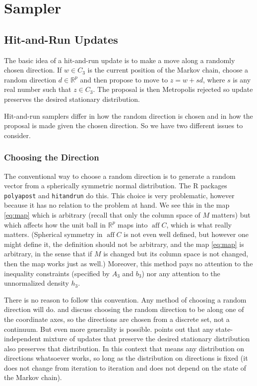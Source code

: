 \documentclass[11pt]{article}
\DeclareMathOperator{\aff}{aff}
\newcommand{\real}{\mathbb{R}}
\begin{document}
\section{Sampler}

\subsection{Hit-and-Run Updates}

The basic idea of a hit-and-run update is to make a move along a randomly
chosen direction.    If $w \in C_3$ is the current position of the Markov
chain, choose a random direction $d \in \real^p$ and then propose to move
to $z = w + s d$, where $s$ is any real number such that $z \in C_3$.
The proposal is then Metropolis rejected so update preserves the desired
stationary distribution.

Hit-and-run samplers differ in how the random direction is chosen and in
how the proposal is made given the chosen direction.  So we have two
different issues to consider.

\subsubsection{Choosing the Direction}

The conventional way to choose a random direction is to generate
a random vector from a spherically symmetric normal distribution.
The R packages \texttt{polyapost} and \texttt{hitandrun} do this.
This choice is very problematic, however because it has no relation
to the problem at hand.  We see this in the map \eqref{eq:map} which
is arbitrary (recall that only the column space of $M$ matters) but
which affects how the unit ball in $\real^p$ maps into $\aff C$,
which is what really matters.  (Spherical symmetry in $\aff C$ is not
even well defined, but however one might define it, the definition
should not be arbitrary, and the map \eqref{eq:map} is arbitrary,
in the sense that if $M$ is changed but its column space is not changed,
then the map works just as well.)
Moreover, this method pays no attention
to the inequality constraints (specified by $A_3$ and $b_3$) nor any
attention to the unnormalized density $h_3$.

There is no reason to follow this convention.  Any method of choosing
a random direction will do.  \citet{smith} and \citet{hit-run-one}
discuss choosing the random direction to be along one of the coordinate axes,
so the directions are chosen from a discrete set, not a continuum.
But even more generality is possible.
\citet[Section~1.12.8]{geyer-intro} points out
that any state-independent mixture of updates that preserve the desired
stationary distribution also preserves that distribution.  In this context
that means any distribution on directions whatsoever works, so long as the
distribution on directions is fixed (it does not change from iteration
to iteration and does not depend on the state of the Markov chain).
\end{document}

